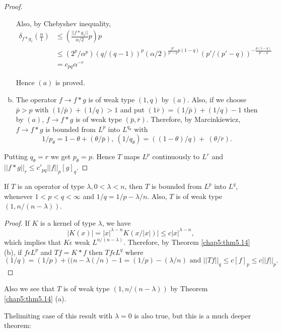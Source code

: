 \begin{proof}
\begin{enumerate}[a)]
    Also, by Chebyshev inequality,
    \begin{align*}
    \delta_{f * g_1} \left(\frac{\alpha}{1}\right) & \le \left(\frac{|| f *
      g_1 ||}{\alpha/2} p\right) p \\
      & \le  (2^p/\alpha^ p) (q/(q-1))^p (\alpha/2)^{\frac{p'}{p'-q} p(1-q)}
      (p'/(p'-q))^{-\frac{p(1-q)}{p'-q}}\\ 
      & = c_{pq} \alpha^{-r}
    \end{align*}\pageoriginale
  
    Hence $(a)$ is proved.
  \item The operator $f \to f * g$ is of weak type $(1, q)$ by
    $(a)$. Also, if we choose $\bar{p} > p$ with $(1/\bar{p})+ (1/q) >
    1$ and put $(1\bar{r}) =  (1/\bar{p}) + (1/q) - 1$ then by $(a)$, $f
    \to f * g$ is of weak type $(\bar{p}, \bar{r})$. Therefore, by
    Marcinkiewicz, $f \to f * g$ is bounded from $L^p$ into
    $L^{q_{\theta}}$ with 
    $$
    1/p_{\theta} = 1 -  \theta + (\theta/\bar{p}), ~ (1/q_{\theta}) =
    ((1-\theta)/q) + ~ (\theta/\bar{r}). 
    $$
  \end{enumerate}
    Putting $q_{\theta} = r $ we get  $p_{\theta} = p$. Hence $T$ maps
    $L^p$ continuously to $L^r $ and $|| f * g ||_r \le c'_{pq} || f ||_p
    [g]_q$. 
\end{proof}

\setcounter{coro}{14}
\begin{coro}\label{chap5:coro5.15}%
  If  $T$ is an operator of type  $\lambda, 0 < \lambda <
  n$, then  $T$ is bounded from  $L^p$ into  $L^q$,
  whenever $1 < p < q < \infty$ and  $1/q = 1/p -
  \lambda/n$. Also, $T$ is of weak type $(1,
  n/(n-\lambda))$. 
\end{coro}

\begin{proof}
  If $K$ is a kernel of type $\lambda$, we have
  $$
  | K (x) | = |x|^{\lambda-n} K(x/|x| ) | \le c|x|^{\lambda-n},
  $$
  which implies that $K \epsilon $ weak $L^{n/
    (n-\lambda)}$. Therefore, by Theorem \ref{chap5:thm5.14}(b),
  if $f \epsilon 
  L^p$ and $Tf = K * f$ then $Tf \epsilon L^q$ where 
{\fontsize{10pt}{12pt}\selectfont
  $$
  (1/q) = (1/p) + ((n-\lambda(/n)-1 = (1/p)-(\lambda/n) \text { and } ||
  Tf ||_q \le c [f]_p \le c || f ||_p. 
  $$}\relax
\end{proof}

Also we see that $T$ is of weak type $(1, n/(n-\lambda))$ by Theorem
\ref{chap5:thm5.14} (a).  

The\pageoriginale limiting case of this result with $\lambda = 0$ is also true, but
this is a much deeper theorem: 

